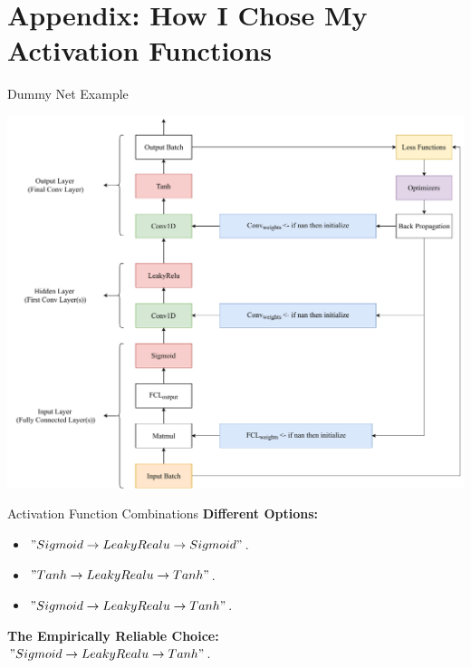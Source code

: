 \documentclass{beamer}
\begin{document}
	\section{Appendix:{\tiny } How I Chose My Activation Functions}
	\begin{frame}{Dummy Net Example}
		\begin{center}
			\includegraphics[height=0.9\textheight]{SimpleNetDiagram}
		\end{center}
	\end{frame}
		\begin{frame}{Activation Function Combinations}
			\textbf{Different Options:}
			\begin{itemize}
				\item $" Sigmoid \rightarrow LeakyRealu \rightarrow Sigmoid "$.
				\item $" Tanh \rightarrow LeakyRealu \rightarrow Tanh "$.
				\item $" Sigmoid \rightarrow LeakyRealu \rightarrow Tanh "$.
			\end{itemize}
			\textbf{The Empirically Reliable Choice:}\\
			\centering $" Sigmoid \rightarrow LeakyRealu \rightarrow Tanh "$.
		\end{frame}
\end{document}
